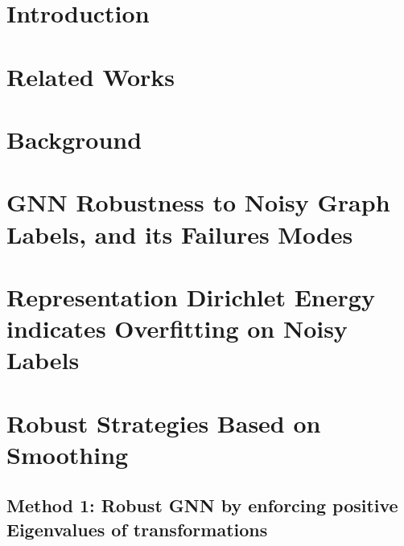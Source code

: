 \documentclass{article}
\theoremstyle{plain}
\theoremstyle{definition}
\theoremstyle{remark}
\begin{document}
\section{Introduction}


\section{Related Works}
\label{sec:related_work}


\section{Background}


\section{GNN Robustness to Noisy Graph Labels, and its Failures Modes}
\label{sec:failure}


\section{Representation Dirichlet Energy indicates Overfitting on Noisy Labels}
\label{sec:Dirichlet_meet_GC}


% 
\section{Robust Strategies Based on Smoothing}
\label{sec:two_smoothing_methods}
\subsection{Method 1: Robust GNN by enforcing positive Eigenvalues of transformations}
\label{sec:positive_eigens}

\end{document}
